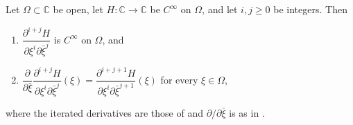 \begin{lemma}
Let $\Omega\subset\mathbb{C}$ be open, let $H\colon\mathbb{C}\to\mathbb{C}$ be
$C^\infty$ on $\Omega$, and let $i,j\ge0$ be integers.  Then
\begin{enumerate}
\item[(a)] $\dfrac{\partial^{i+j}H}{\partial\xi^i\partial\bar\xi^j}$ is
$C^\infty$ on $\Omega$, and
\item[(b)] $\dfrac{\partial}{\partial\bar\xi}
\dfrac{\partial^{i+j}H}{\partial\xi^i\partial\bar\xi^j}(\xi)
=\dfrac{\partial^{i+j+1}H}{\partial\xi^i\partial\bar\xi^{j+1}}(\xi)$ for every
$\xi\in\Omega$,
\end{enumerate}
where the iterated derivatives are those of  and
$\partial/\partial\bar\xi$ is as in .
\end{lemma}
